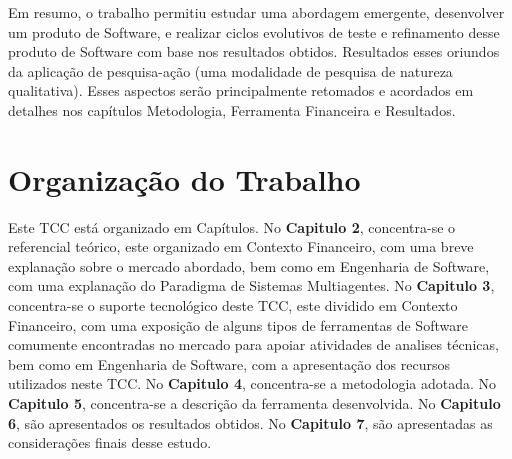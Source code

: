 Em resumo, o trabalho permitiu estudar uma abordagem emergente, desenvolver um produto de Software, e realizar ciclos evolutivos de teste e refinamento desse produto de Software com base nos resultados obtidos. Resultados esses oriundos da aplicação de pesquisa-ação \cite{rocha2012} (uma modalidade de pesquisa de natureza qualitativa). Esses aspectos serão principalmente retomados e acordados em detalhes nos capítulos Metodologia, Ferramenta Financeira e Resultados.

\section{Organização do Trabalho}

Este TCC está organizado em Capítulos. No \textbf{Capitulo 2}, concentra-se o referencial teórico, este organizado em Contexto Financeiro, com uma breve explanação sobre o mercado abordado, bem como em Engenharia de Software, com uma explanação do Paradigma de Sistemas Multiagentes. No \textbf{Capitulo 3}, concentra-se o suporte tecnológico deste TCC, este dividido em Contexto Financeiro, com uma exposição de alguns tipos de ferramentas de Software comumente encontradas no mercado para apoiar atividades de analises técnicas, bem como em Engenharia de Software, com a apresentação dos recursos utilizados neste TCC. No \textbf{Capitulo 4}, concentra-se a metodologia adotada. No \textbf{Capitulo 5}, concentra-se a descrição da ferramenta desenvolvida. No \textbf{Capitulo 6}, são apresentados os resultados obtidos. No \textbf{Capitulo 7}, são apresentadas as considerações finais desse estudo.




